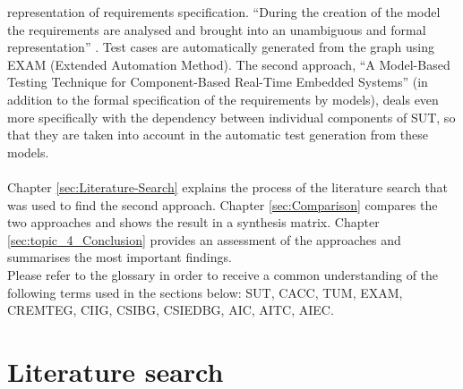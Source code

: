 representation of requirements specification. \enquote{During
the creation of the model the requirements are analysed and brought
into an unambiguous and formal representation} \cite{Siegl2010}.
Test cases are automatically generated from the graph using EXAM (Extended
Automation Method). The second approach, \enquote{A Model-Based
Testing Technique for Component-Based Real-Time Embedded Systems}
(in addition to the formal specification of the requirements by models),
deals even more specifically with the dependency between individual
components of SUT, so that they are taken into account in the automatic
test generation from these models.\\
 \\
Chapter \ref{sec:Literature-Search} explains the process of the literature
search that was used to find the second approach. Chapter \ref{sec:Comparison}
compares the two approaches and shows the result in a synthesis matrix.
Chapter \ref{sec:topic_4_Conclusion} provides an assessment of the approaches
and summarises the most important findings.\\
Please refer to the glossary in order to receive a common understanding of the following terms used in the sections below: SUT, CACC, TUM, EXAM, CREMTEG, CIIG, CSIBG, CSIEDBG, AIC, AITC, AIEC.

\section{Literature search\label{sec:Literature-Search}}

